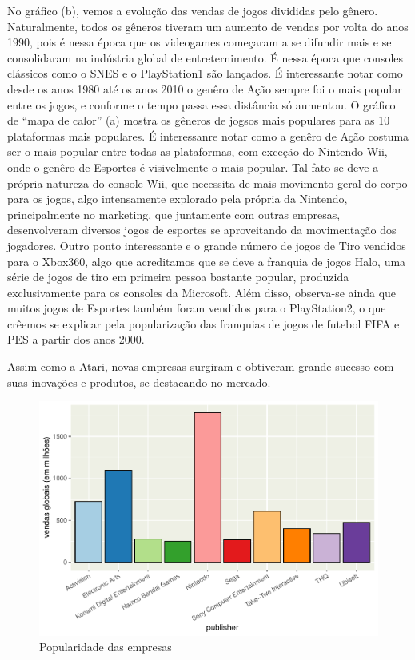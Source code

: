 \documentclass[draft]{agujournal2018}
\begin{document}
No gráfico (b), vemos a evolução das vendas de jogos divididas pelo
gênero. Naturalmente, todos os gêneros tiveram um aumento de vendas por
volta do anos 1990, pois é nessa época que os videogames começaram a se
difundir mais e se consolidaram na indústria global de entreternimento.
É nessa época que consoles clássicos como o SNES e o PlayStation1 são
lançados. É interessante notar como desde os anos 1980 até os anos 2010
o genêro de Ação sempre foi o mais popular entre os jogos, e conforme o
tempo passa essa distância só aumentou. O gráfico de ``mapa de calor''
(a) mostra os gêneros de jogsos mais populares para as 10 plataformas
mais populares. É interessanre notar como a genêro de Ação costuma ser o
mais popular entre todas as plataformas, com exceção do Nintendo Wii,
onde o genêro de Esportes é visivelmente o mais popular. Tal fato se
deve a própria natureza do console Wii, que necessita de mais movimento
geral do corpo para os jogos, algo intensamente explorado pela própria
da Nintendo, principalmente no marketing, que juntamente com outras
empresas, desenvolveram diversos jogos de esportes se aproveitando da
movimentação dos jogadores. Outro ponto interessante e o grande número
de jogos de Tiro vendidos para o Xbox360, algo que acreditamos que se
deve a franquia de jogos Halo, uma série de jogos de tiro em primeira
pessoa bastante popular, produzida exclusivamente para os consoles da
Microsoft. Além disso, observa-se ainda que muitos jogos de Esportes
também foram vendidos para o PlayStation2, o que crêemos se explicar
pela popularização das franquias de jogos de futebol FIFA e PES a partir
dos anos 2000.

Assim como a Atari, novas empresas surgiram e obtiveram grande sucesso
com suas inovações e produtos, se destacando no mercado.

\begin{figure}[h]
\includegraphics{vendas_de_jogos_de_videogames_files/figure-latex/unnamed-chunk-7-1} \caption{Popularidade das empresas}\label{fig:unnamed-chunk-7}
\end{figure}
\end{document}
